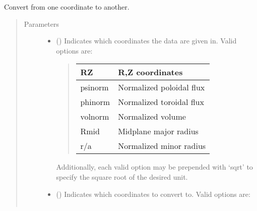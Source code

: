 \documentclass[letterpaper,10pt,english]{sphinxmanual}
\begin{document}
\begin{fulllineitems}
\begin{fulllineitems}
\label{\detokenize{eqtools:eqtools.core.Equilibrium.rho2rho}}
Convert from one coordinate to another.
\begin{quote}\begin{description}
\item[{Parameters}] \leavevmode\begin{itemize}
\item {} 
 () \textendash{} 
Indicates which coordinates the data are given in.
Valid options are:
\begin{quote}


\begin{savenotes}\sphinxattablestart
\centering
\begin{tabulary}{\linewidth}[t]{|T|T|}
\hline

RZ
&
R,Z coordinates
\\
\hline
psinorm
&
Normalized poloidal flux
\\
\hline
phinorm
&
Normalized toroidal flux
\\
\hline
volnorm
&
Normalized volume
\\
\hline
Rmid
&
Midplane major radius
\\
\hline
r/a
&
Normalized minor radius
\\
\hline
\end{tabulary}
\par
\sphinxattableend\end{savenotes}
\end{quote}

Additionally, each valid option may be prepended with ‘sqrt’
to specify the square root of the desired unit.


\item {} 
 () \textendash{} 
Indicates which coordinates to convert to.
Valid options are:
\begin{quote}


\begin{savenotes}\sphinxattablestart
\centering
\begin{tabulary}{\linewidth}[t]{|T|T|}
\hline


\end{tabulary}
\end{savenotes}
\end{quote}
\end{itemize}
\end{description}
\end{quote}
\end{fulllineitems}
\end{fulllineitems}
\end{document}
